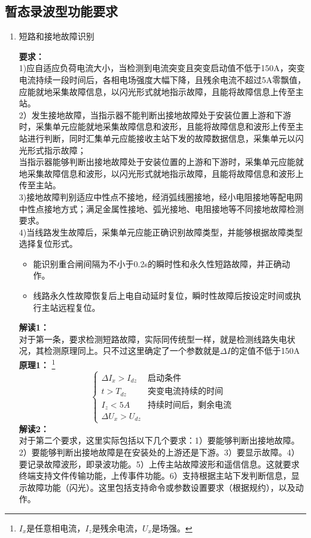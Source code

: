 \documentclass{article}
\begin{document}
\begin{CJK}{UTF8}{gbsn}
\section{暂态录波型功能要求}
\begin{enumerate}
\item 短路和接地故障识别
	\par
	\textbf{要求：}\\
	1)应自适应负荷电流大小，当检测到电流突变且突变启动值不低于150A，突变电流持续一段时间后，各相电场强度大幅下降，且残余电流不超过5A零飘值，应能就地采集故障信息，以闪光形式就地指示故障，且能将故障信息上传至主站。\\
	2）发生接地故障，当指示器不能判断出接地故障处于安装位置上游和下游时，采集单元应能就地采集故障信息和波形，且能将故障信息和波形上传至主站进行判断，同时汇集单元应能接收主站下发的故障数据信息，采集单元以闪光形式指示故障；\\
	当指示器能够判断出接地故障处于安装位置的上游和下游时，采集单元应能就地采集故障信息和波形，以闪光形式就地指示故障，且能将故障信息和波形上传至主站。\\
	3)接地故障判别适应中性点不接地，经消弧线圈接地，经小电阻接地等配电网中性点接地方式；满足金属性接地、弧光接地、电阻接地等不同接地故障检测要求。\\
	4)当线路发生故障后，采集单元应能正确识别故障类型，并能够根据故障类型选择复位形式。
	\begin{itemize}
			\item 能识别重合闸间隔为不小于0.2s的瞬时性和永久性短路故障，并正确动作。
			\item 线路永久性故障恢复后上电自动延时复位，瞬时性故障后按设定时间或执行主站远程复位。
	\end{itemize}
	\textbf{解读1：}\\
	对于第一条，要求检测短路故障，实际同传统型一样，就是检测线路失电状况，其检测原理同上。只不过这里确定了一个参数就是$\Delta I$的定值不低于150A\\
	\textbf{原理1：}
	\footnote{$I_x$是任意相电流，$I_z$是残余电流，$U_x$是场强。}
	$$	
		\left\{ \begin{array}{ll}
				\Delta I_x>I_{dz} & \textrm{启动条件}\\
			    t>T_{dz} & \textrm{突变电流持续的时间}\\
				I_z<5A & \textrm{持续时间后，剩余电流}\\ 
			\Delta U_x>U_{dz}
		\end{array}
		\right.
	$$
	\textbf{解读2：}\\
	对于第二个要求，这里实际包括以下几个要求：1）要能够判断出接地故障。2）要能够判断出接地故障是在安装处的上游还是下游。3）要显示故障。4）要记录故障波形，即录波功能。5）上传主站故障波形和遥信信息。这就要求终端支持文件传输功能，上传事件功能。6）支持根据主站下发判断信息，显示故障功能（闪光）。这里包括支持命令或参数设置要求（根据规约），以及动作。\\

\end{enumerate}
\end{CJK}
\end{document}
